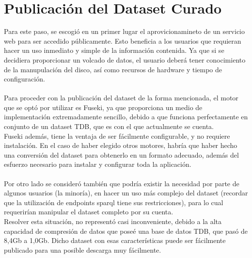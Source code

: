 \chapter{Publicación del Dataset Curado}
\label{chapter:publicacion}

Para este paso, se escogió en un primer lugar el aprovicionamineto de un servicio web para ser accedido públicamente. Esto beneficia 
a los usuarios que requieran hacer un uso inmediato y simple de la información contenida. Ya que si se decidiera proporcionar un 
volcado de datos, el usuario deberá tener conocimiento de la manupulación del disco, así como recursos de hardware y tiempo de configuración.\\
\\
Para proceder con la publicación del dataset de la forma mencionada, el motor que se optó por utilizar es Fuseki, ya que proporciona un
medio de implementación extremadamente sencillo, debido a que funciona perfectamente en conjunto de un dataset TDB, que es con el que 
actualmente se cuenta. \\
Fuseki además, tiene la ventaja de ser fácilmente configurable, y no requiere instalación. En el caso de haber elegido otros motores, 
habría que haber hecho una conversión del dataset para obtenerlo en un formato adecuado, además del esfuerzo necesario para instalar y configurar 
toda la aplicación.\\
\\
Por otro lado se consideró también que podría existir la necesidad por parte de algunos usuarios (la minoría), en hacer un uso más complejo del 
dataset (recordar que la utilización de endpoints sparql tiene sus restricciones), para lo cual requerirían manipular el dataset completo 
por su cuenta.\\
Resolver esta situación, no representó casi inconveniente, debido a la alta capacidad de compresión de datos que poseé una base de datos TDB, 
que pasó de 8,4Gb a 1,0Gb. Dicho dataset con esas características puede ser fácilmente publicado para una posible descarga muy fácilmente. 